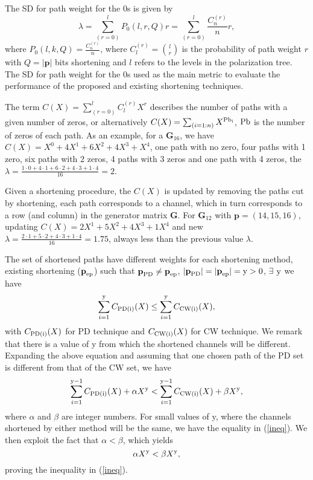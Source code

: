 \documentclass[10pt,twocolumn]{IEEEtran}
\begin{document}
The SD for path weight for the 0s is given by \cite{Niu}
\begin{equation}
\lambda = \sum_{(r = 0)}^lP_0(l,r,Q)r = \sum_{(r = 0)}^l\frac{C_n^{(r)}}{n}r,
\end{equation}
where $P_0(l,k,Q)=\frac{C_n^{(r)}}{n}$, where
$C_l^{(r)}=\binom{l}{r}$ is the probability of path weight $r$ with
$Q=|\textbf{p}|$ bits shortening and $l$ refers to the levels in the
polarization tree. The SD for path weight for the 0s used as the
main metric to evaluate the performance of the proposed and existing
shortening techniques.

The term $C(X)=\sum_{(r = 0)}^lC_l^{(r)}X^r$ describes the number of
paths with a given number of zeros, or alternatively
$C(X)=\sum_{(i=1:n)}X^{\rm Pb_i}$, $\rm Pb$ is the number of zeros
of each path. As an example, for a $\textbf{G}_{16}$, we have
$C(X)=X^0+4X^1+6X^2+4X^3+X^4$, one path with no zero, four paths
with 1 zero, six paths with 2 zeros, 4 paths with 3 zeros and one
path with 4 zeros, the $\lambda = \frac{1 \cdot 0 +4 \cdot 1+6 \cdot
2+4 \cdot 3+1 \cdot 4}{16}=2$.

Given a shortening procedure, the $C(X)$ is updated by removing the
paths cut by shortening, each path corresponds to a channel, which
in turn corresponds to a row (and column) in the generator matrix
$\textbf{G}$. For $\textbf{G}_{12}$ with $\textbf{p} = (14,15,16)$,
updating $C(X)=2X^1+5X^2+4X^3+1X^4$ and new $\lambda = \frac{2 \cdot
1+5 \cdot 2+4 \cdot 3+1 \cdot 4}{16}=1.75$, always less than the
previous value $\lambda$.

The set of shortened paths have different weights for each
shortening method, existing shortening ($\textbf{p}_{\rm ep}$) such
that $\textbf{p}_{\rm PD} \neq \textbf{p}_{\rm ep}$,
$|\textbf{p}_{\rm PD}|=|\textbf{p}_{\rm ep}|=\rm y>0$,  $\exists$
$\rm y$ we have
\begin{equation}
\sum_{i=1}^{\rm y}C_{\rm PD(i)}(X) \leq \sum_{i=1}^{\rm y}C_{\rm
CW(i)}(X), \label{ineq}
\end{equation}
with $C_{\rm PD(i)}(X)$ for PD technique and $C_{\rm CW(i)}(X)$ for
CW technique. %
We remark that there is a value of y from which the shortened
channels will be different. Expanding the above equation and
assuming that one chosen path of the PD set is different from that
of the CW set, we have
\begin{eqnarray}
\sum_{i=1}^{\rm y-1}C_{\rm PD(i)}(X) + \alpha X^{\rm y} <  %
\sum_{i=1}^{\rm y-1}C_{\rm CW(i)}(X) + \beta X^{\rm y},
\end{eqnarray}
where $\alpha$ and $\beta$ are integer numbers. For small values of
y, where the channels shortened by either method will be the same,
we have the equality in (\ref{ineq}). We then exploit the fact that
$\alpha < \beta$, which yields
\begin{equation}
\alpha X^{\rm y} < \beta X^{\rm y},
\end{equation}
proving the inequality in (\ref{ineq}).
\end{document}
